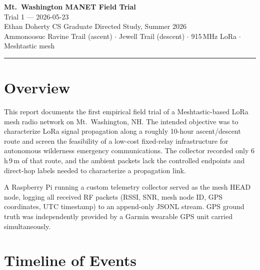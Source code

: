 \documentclass[11pt,letterpaper]{article}
\begin{document}
\begin{center}
  {\LARGE\bfseries\color{mainblue} Mt.\ Washington MANET Field Trial}\\[4pt]
  {\large Trial 1 --- 2026-05-23}\\[6pt]
  {\normalsize Ethan Doherty \quad CS Graduate Directed Study, Summer 2026}\\[2pt]
  {\small Ammonoosuc Ravine Trail (ascent) $\cdot$ Jewell Trail (descent) $\cdot$
  915\,MHz LoRa $\cdot$ Meshtastic mesh}
\end{center}

\vspace{6pt}
\hrule
\vspace{12pt}

\section{Overview}

This report documents the first empirical field trial of a Meshtastic-based LoRa mesh radio
network on Mt.\ Washington, NH. The intended objective was to characterize LoRa signal
propagation along a roughly 10-hour ascent/descent route and screen the feasibility of a
low-cost fixed-relay infrastructure for autonomous wilderness emergency communications.
The collector recorded only 6\,h\,9\,m of that route, and the ambient packets lack the
controlled endpoints and direct-hop labels needed to characterize a propagation link.

A Raspberry Pi running a custom telemetry collector served as the mesh HEAD node,
logging all received RF packets (RSSI, SNR, mesh node ID, GPS coordinates, UTC
timestamp) to an append-only JSONL stream. GPS ground truth was independently provided
by a Garmin wearable GPS unit carried simultaneously.

\section{Timeline of Events}
\end{document}
